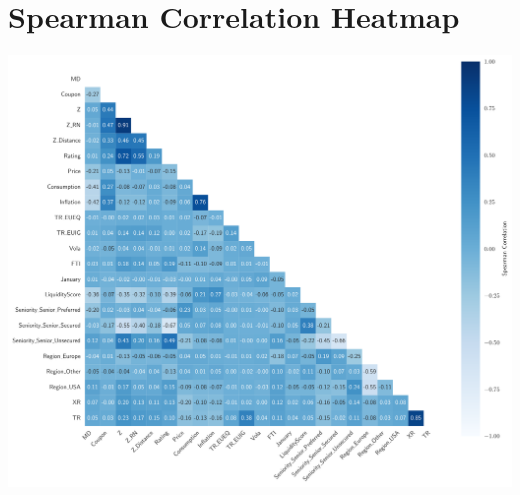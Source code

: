 \section{Spearman Correlation Heatmap}
\begin{center}
\begin{minipage}{\textwidth}
    \centering
    \includegraphics[width=\textwidth]{images/correlation_heatmap.pdf}
    \label{fig:correlation_heatmap}
\end{minipage}
\end{center}

